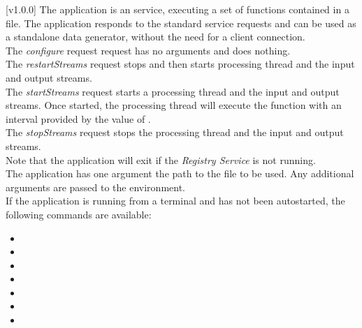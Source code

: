 [v1.0.0]
The  application is an  service,
executing a set of \JS{} functions contained in a file.
The application responds to the standard  service requests and can be used
as a standalone data generator, without the need for a client connection.\\

The \emph{configure} request request has no arguments and does nothing.\\

The \emph{restartStreams} request stops and then starts processing thread and the input
and output streams.\\

The \emph{startStreams} request starts a processing thread and the input and output
streams.
Once started, the processing thread will execute the  function with
an interval provided by the value of .\\

The \emph{stopStreams} request stops the processing thread and the input and output
streams.\\ 

Note that the application will exit if the \emph{Registry Service} is not running.\\

The application has one argument \longDash{} the path to the \JS{} file to be used.
Any additional arguments are passed to the \JS{} environment.
\insertAppParameters{}
\insertTagDescription{\JSIO}
\insertFilterServiceComment{}\\

If the application is running from a terminal and has not been autostarted, the following
commands are available:
\begin{itemize}
\item{}
\item\exSp{}
\item\exSp{}
\item\exSp{}
\item\exSp{}
\item\exSp{}
\item\exSp{}
\end{itemize}
\primaryEnd{}
